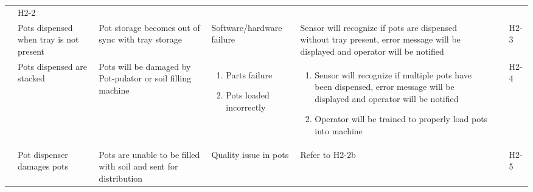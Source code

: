 \documentclass{article}
\begin{document}
\begin{landscape}
\begin{center}
\begin{longtable}{|l|  p{3cm}  p{4cm}  p{4cm}  p{4cm}  p{1cm}  p{1cm}|}
        &
        H2-2\\
        &
        Pots dispensed when tray is not present&
        Pot storage becomes out of sync with tray storage&
        Software/hardware failure&
        Sensor will recognize if pots are dispensed without tray present, error message will be displayed and operator will be notified&
        &
        H2-3\\

        &
        Pots dispensed are stacked&
        Pots will be damaged by Pot-pulator or soil filling machine&
        \begin{enumerate}[label=(\alph*)]
            \item Parts failure
            \item Pots loaded incorrectly
        \end{enumerate}&
        \begin{enumerate}[label=(\alph*)]
            \item Sensor will recognize if multiple pots have been dispensed, error message will be displayed and operator will be notified
            \item Operator will be trained to properly load pots into machine
        \end{enumerate}&\
        &
        H2-4\\

        &
        Pot dispenser damages pots&
        Pots are unable to be filled with soil and sent for distribution&
        Quality issue in pots&
        Refer to H2-2b&
        &
        H2-5\\

        \hline



        




    \cline{2-7}
    \hline

    \end{longtable}
\end{center}
\end{landscape}
\end{document}
